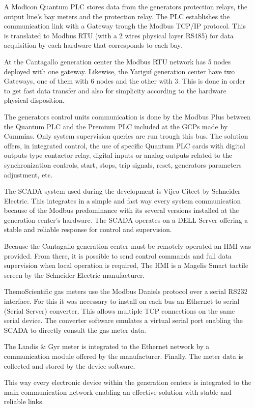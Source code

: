 A Modicon Quantum PLC stores data from the generators protection
relays, the output line's bay meters and the protection relay. The PLC
establishes the communication link with a Gateway trough the Modbus
TCP/IP protocol. This is translated to Modbus RTU (with a 2 wires
physical layer RS485) for data acquisition by each hardware that
corresponds to each bay.

At the Cantagallo generation center the Modbus RTU network has 5 nodes
deployed with one gateway. Likewise, the Yariguí generation center 
have two Gateways, one of them  with 6 nodes and the other with 3. 
This is done  in order to get fast data transfer and also for simplicity 
according to the hardware physical disposition.

The generators control units communication is done by the Modbus Plus
between the Quantum PLC and the Premium PLC included at the GCPs made
by Cummins. Only system supervision queries are run trough this bus.
The solution offers, in integrated control, the use of specific
Quantum PLC cards with digital outputs type contactor relay, digital inputs or
analog outputs related to the synchronization controls, start, stops,
trip signals, reset, generators parameters adjustment, etc.

The SCADA system used during the development is Vijeo Citect by
Schneider Electric. This integrates in a simple and fast way every
system communication because of the Modbus predominance with its
several versions installed at the generation center's hardware. The
SCADA operates on a DELL Server offering a stable and reliable
response for control and supervision.

Because the Cantagallo generation center must be remotely operated
an HMI was provided. From there, it is possible to send control
commands and full data supervision when local operation is required,
The HMI is a Magelis Smart tactile screen by the Schneider Electric 
manufacturer.

ThemoScientific gas meters use the Modbus Daniels protocol over a
serial RS232 interface. For this it was necessary to install on each
bus an Ethernet to serial (Serial Server) converter. This allows
multiple TCP connections on the same serial device. The converter
software emulates a virtual serial port enabling the SCADA to directly
consult the gas meter data.

The Landis \& Gyr meter is integrated to the Ethernet network by a
communication module offered by the manufacturer. Finally, The meter
data is collected and stored by the device software.

This way every electronic device within the generation centers is
integrated to the main communication network enabling an effective
solution with stable and reliable links.

